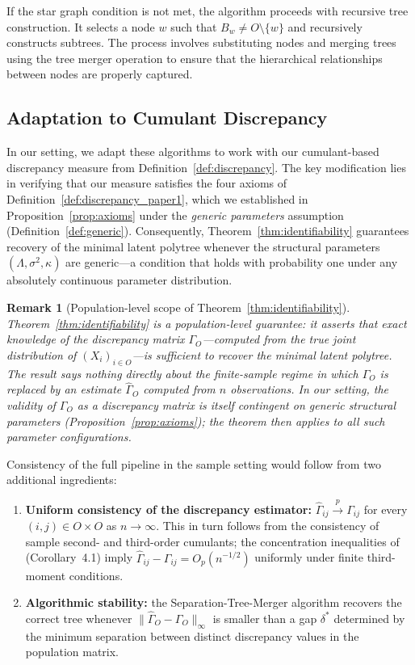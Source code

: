 \documentclass[11pt,a4paper]{article}
\numberwithin{equation}{section}
\newtheorem{remark}[theorem]{Remark}
\begin{document}
If the star graph condition is not met, the algorithm proceeds with recursive tree construction. It selects a node $w$ such that $B_w \neq O \setminus \{w\}$ and recursively constructs subtrees. The process involves substituting nodes and merging trees using the tree merger operation to ensure that the hierarchical relationships between nodes are properly captured.

\subsection{Adaptation to Cumulant Discrepancy}

In our setting, we adapt these algorithms to work with our cumulant-based
discrepancy measure from Definition~\ref{def:discrepancy}. The key
modification lies in verifying that our measure satisfies the four axioms of
Definition~\ref{def:discrepancy_paper1}, which we established in
Proposition~\ref{prop:axioms} under the \emph{generic parameters} assumption
(Definition~\ref{def:generic}).  Consequently, Theorem~\ref{thm:identifiability}
guarantees recovery of the minimal latent polytree whenever the structural
parameters $(\Lambda,\sigma^{2},\kappa)$ are generic---a condition that holds
with probability one under any absolutely continuous parameter distribution.

\begin{remark}[Population-level scope of Theorem~\ref{thm:identifiability}]
\label{rem:population_scope}
Theorem~\ref{thm:identifiability} is a \emph{population-level} guarantee: it
asserts that exact knowledge of the discrepancy matrix $\Gamma_O$---computed
from the true joint distribution of $(X_i)_{i\in O}$---is sufficient to recover
the minimal latent polytree.  The result says nothing directly about the
finite-sample regime in which $\Gamma_O$ is replaced by an estimate
$\hat\Gamma_O$ computed from $n$ observations.  In our setting, the validity of
$\Gamma_O$ as a discrepancy matrix is itself contingent on generic structural
parameters (Proposition~\ref{prop:axioms}); the theorem then applies to all
such parameter configurations.
\end{remark}

Consistency of the full pipeline in the sample setting would follow from two
additional ingredients:
\begin{enumerate}[label=(\roman*)]
  \item \textbf{Uniform consistency of the discrepancy estimator:}
    $\hat\Gamma_{ij}\xrightarrow{p}\Gamma_{ij}$ for every $(i,j)\in O\times O$
    as $n\to\infty$.  This in turn follows from the consistency of sample
    second- and third-order cumulants; the concentration inequalities of
    \citet{tramontano:monod:drton:2022} (Corollary~4.1) imply
    $\hat\Gamma_{ij}-\Gamma_{ij}=O_p(n^{-1/2})$ uniformly under finite
    third-moment conditions.
  \item \textbf{Algorithmic stability:} the Separation-Tree-Merger algorithm
    recovers the correct tree whenever $\|\hat\Gamma_O-\Gamma_O\|_\infty$ is
    smaller than a gap $\delta^*$ determined by the minimum separation between
    distinct discrepancy values in the population matrix.
\end{enumerate}
\end{document}
